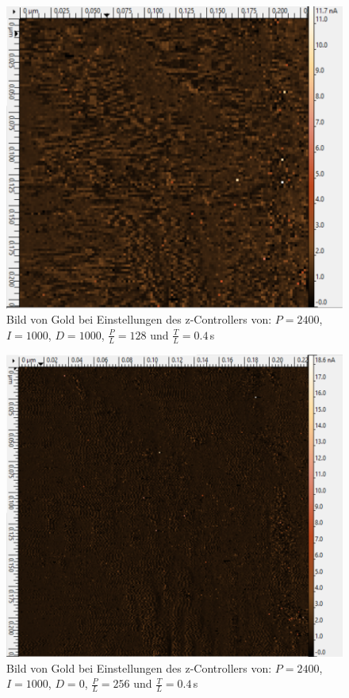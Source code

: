 \begin{figure}[ht]
	\includegraphics[scale=0.5]{Bild/Para/P13}
	\centering
	\caption[Parameter Änderung 13]{Bild von Gold bei Einstellungen des z-Controllers von: $P=2400$, $I=1000$, $D=1000$, $\frac{P}{L}=128$ und $\frac{T}{L}=0.4\,$s}
\end{figure}
\begin{figure}[ht]
	\includegraphics[scale=0.5]{Bild/Para/P14}
	\centering
	\caption[Parameter Änderung 14]{Bild von Gold bei Einstellungen des z-Controllers von: $P=2400$, $I=1000$, $D=0$, $\frac{P}{L}=256$ und $\frac{T}{L}=0.4\,$s}
\end{figure}
